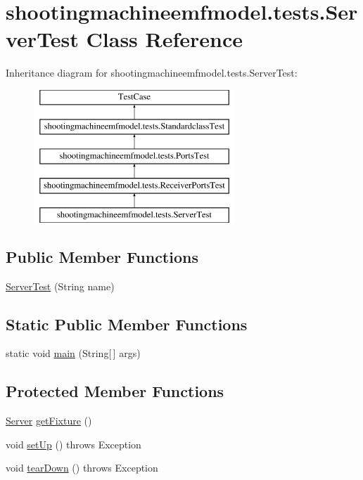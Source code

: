\hypertarget{classshootingmachineemfmodel_1_1tests_1_1_server_test}{\section{shootingmachineemfmodel.\-tests.\-Server\-Test Class Reference}
\label{classshootingmachineemfmodel_1_1tests_1_1_server_test}
}
Inheritance diagram for shootingmachineemfmodel.\-tests.\-Server\-Test\-:\begin{figure}[H]
\begin{center}
\leavevmode
\includegraphics[height=5.000000cm]{classshootingmachineemfmodel_1_1tests_1_1_server_test}
\end{center}
\end{figure}
\subsection*{Public Member Functions}
\begin{DoxyCompactItemize}
\item 
\hyperlink{classshootingmachineemfmodel_1_1tests_1_1_server_test_a1d6586f4679a08f399d137534fc32425}{Server\-Test} (String name)
\end{DoxyCompactItemize}
\subsection*{Static Public Member Functions}
\begin{DoxyCompactItemize}
\item 
static void \hyperlink{classshootingmachineemfmodel_1_1tests_1_1_server_test_a995cb0c309028e3deb44be8b2ba51b9c}{main} (String\mbox{[}$\,$\mbox{]} args)
\end{DoxyCompactItemize}
\subsection*{Protected Member Functions}
\begin{DoxyCompactItemize}
\item 
\hyperlink{interfaceshootingmachineemfmodel_1_1_server}{Server} \hyperlink{classshootingmachineemfmodel_1_1tests_1_1_server_test_a3ec629ea127653c2a84c667edd4f3b45}{get\-Fixture} ()
\item 
void \hyperlink{classshootingmachineemfmodel_1_1tests_1_1_server_test_afeba36dc0286f48748e97c1e8a158263}{set\-Up} ()  throws Exception 
\item 
void \hyperlink{classshootingmachineemfmodel_1_1tests_1_1_server_test_a83f4cf03bf0bc68e9b86b6576bd4c813}{tear\-Down} ()  throws Exception 
\end{DoxyCompactItemize}
